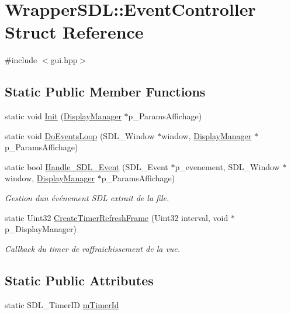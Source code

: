 \hypertarget{struct_wrapper_s_d_l_1_1_event_controller}{}\section{Wrapper\+S\+DL\+:\+:Event\+Controller Struct Reference}
\label{struct_wrapper_s_d_l_1_1_event_controller}


{\ttfamily \#include $<$gui.\+hpp$>$}

\subsection*{Static Public Member Functions}
\begin{DoxyCompactItemize}
\item 
static void \hyperlink{struct_wrapper_s_d_l_1_1_event_controller_a1d120644a13d32238f3372b601a67f80}{Init} (\hyperlink{class_display_manager}{Display\+Manager} $\ast$p\+\_\+\+Params\+Affichage)
\item 
static void \hyperlink{struct_wrapper_s_d_l_1_1_event_controller_a04b13cf306ca88f74c92efb91f4586a3}{Do\+Events\+Loop} (S\+D\+L\+\_\+\+Window $\ast$window, \hyperlink{class_display_manager}{Display\+Manager} $\ast$p\+\_\+\+Params\+Affichage)
\item 
static bool \hyperlink{struct_wrapper_s_d_l_1_1_event_controller_a07cffdf5cf9e8ed68e645239602819d4}{Handle\+\_\+\+S\+D\+L\+\_\+\+Event} (S\+D\+L\+\_\+\+Event $\ast$p\+\_\+evenement, S\+D\+L\+\_\+\+Window $\ast$window, \hyperlink{class_display_manager}{Display\+Manager} $\ast$p\+\_\+\+Params\+Affichage)
\begin{DoxyCompactList}\small\item\em Gestion d\textquotesingle{}un événement S\+DL extrait de la file. \end{DoxyCompactList}\item 
static Uint32 \hyperlink{struct_wrapper_s_d_l_1_1_event_controller_ad4516dc1813e1ab583659ae8386b84af}{Create\+Timer\+Refresh\+Frame} (Uint32 interval, void $\ast$p\+\_\+\+Display\+Manager)
\begin{DoxyCompactList}\small\item\em Callback du timer de raffraichissement de la vue. \end{DoxyCompactList}\end{DoxyCompactItemize}
\subsection*{Static Public Attributes}
\begin{DoxyCompactItemize}
\item 
static S\+D\+L\+\_\+\+Timer\+ID \hyperlink{struct_wrapper_s_d_l_1_1_event_controller_a9d7e9e2326802d622fc1bd9e5a22677b}{m\+Timer\+Id}
\end{DoxyCompactItemize}


